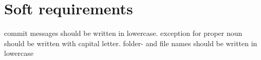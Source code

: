 \chapter{Soft requirements}
commit messages should be written in lowercase. exception for proper noun should be written with capital letter. 
folder- and file names should be written in lowercase 